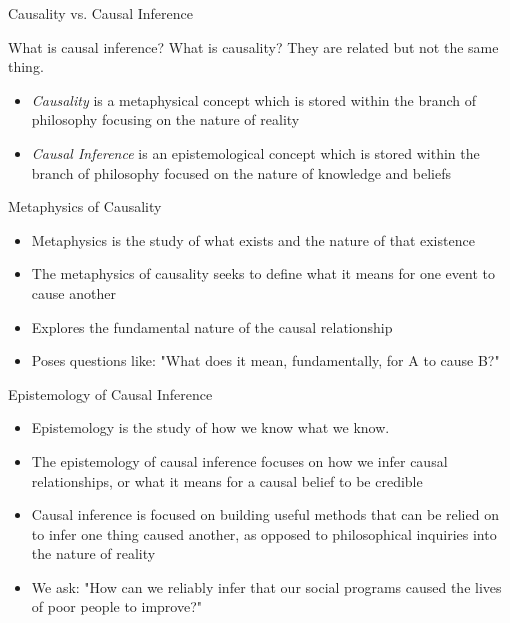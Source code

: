 \documentclass{beamer}
\begin{document}
\begin{frame}{Causality vs. Causal Inference}

What is causal inference?  What is causality?  They are related but not the same thing. 

\bigskip

\begin{itemize}
\item \emph{Causality} is a metaphysical concept which is stored within the branch of philosophy focusing on the nature of reality
\item \emph{Causal Inference} is an epistemological concept which is stored within the branch of philosophy focused on the nature of knowledge and beliefs
\end{itemize}
\end{frame}


\begin{frame}{Metaphysics of Causality}
\begin{itemize}
\item Metaphysics is the study of what exists and the nature of that existence
\item The metaphysics of causality seeks to define what it means for one event to cause another
\item Explores the fundamental nature of the causal relationship
\item Poses questions like: "What does it mean, fundamentally, for A to cause B?"
\end{itemize}
\end{frame}

\begin{frame}{Epistemology of Causal Inference}
\begin{itemize}
\item Epistemology is the study of how we know what we know.
\item The epistemology of causal inference focuses on how we infer causal relationships, or what it means for a causal belief to be credible
\item Causal inference is focused on building useful methods that can be relied on to infer one thing caused another, as opposed to philosophical inquiries into the nature of reality
\item We ask: "How can we reliably infer that our social programs caused the lives of poor people to improve?"
\end{itemize}
\end{frame}
\end{document}
